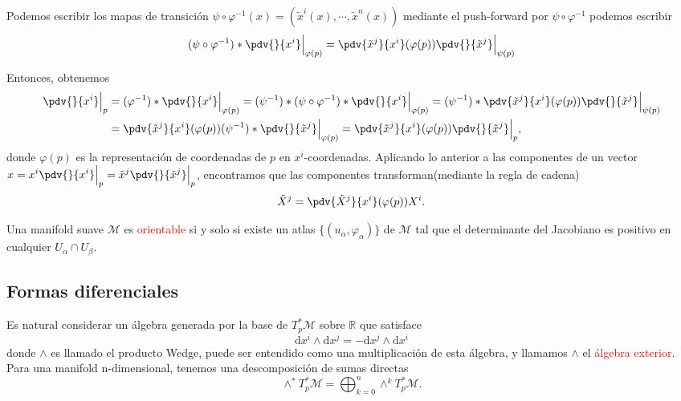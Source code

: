\documentclass[../main]{subfiles}
\begin{document}
\begin{adjustwidth}{0pt}{-100pt}
Podemos escribir los mapas de transición $\psi \circ \varphi^{-1}(x)=\left(\tilde{x}^{i}(x), \cdots, \tilde{x}^{n}(x)\right)$ mediante el push-forward por $\psi \circ \varphi^{-1}$ podemos escribir 
\begin{equation}
    (\psi \circ \varphi^{-1}) *\pdv{}{x^{i}}\Big{|}_{\varphi(p)}=\pdv{\tilde{x}^{j}}{x^{i}}(\varphi(p))\pdv{}{\tilde{x}^{j}}\Big{|}_{\psi(p)}
\end{equation}

Entonces, obtenemos 
\begin{equation}
    \begin{split}
        \pdv{}{x^{i}}\Big{|}_p&=(\varphi^{-1}) * \pdv{}{x^{i}}\Big{|}_{\varphi(p)}=(\psi^{-1})*(\psi \circ \varphi^{-1})*\pdv{}{x^{i}}\Big{|}_{\varphi(p)}=(\psi^{-1})*\pdv{\tilde{x}^{j}}{x^{i}}(\varphi(p))\pdv{}{\tilde{x}^j}\Big{|}_{\psi(p)}\\
        &=\pdv{\tilde{x}^j}{x^{i}}(\varphi(p))(\psi^{-1})*\pdv{}{\tilde{x}^j}\Big{|}_{\varphi(p)}=\pdv{\tilde{x}^j}{x^{i}}(\varphi(p))\pdv{}{\tilde{x}^j}\Big{|}_p,
    \end{split}
\end{equation}
donde $\varphi(p)$ es la representación de coordenadas de $p$ en $x^{i}$-coordenadas. Aplicando lo anterior a las componentes de un vector $\displaystyle x=x^{i}\pdv{}{x^{i}}\Big{|}_p=\tilde{x}^j\pdv{}{\tilde{x}^j}\Big{|}_p$, encontramos que las componentes transforman(mediante la regla de cadena)
\begin{equation}
    \tilde{X}^j=\pdv{\tilde{X}^j}{x^{i}}(\varphi(p))X^{i}.
\end{equation}

Una manifold suave $\mathcal{M}$ es \textcolor{red}{orientable} si y solo si existe un atlas $\{ (u_{\alpha}, \varphi_{\alpha})\}$ de $\mathcal{M}$ tal que el determinante del Jacobiano es positivo en cualquier $U_{\alpha} \cap U_{\beta}$.


\subsection{Formas diferenciales}
Es natural considerar un álgebra generada por la base de $T^{*}_p \mathcal{M}$ sobre $\mathbb{R}$ que satisface 
\begin{equation}
    \mathrm{d}x^{i} \wedge \mathrm{d}x^j=-\mathrm{d}x^j \wedge \mathrm{d}x^{i}
\end{equation}
donde $\wedge$ es llamado el producto Wedge, puede ser entendido como una multiplicación de esta álgebra, y llamamos $\wedge$ el \textcolor{red}{álgebra exterior}. Para una manifold n-dimensional, tenemos una descomposición de sumas directas
\begin{equation}
    \wedge^{*}T^{*}_p \mathcal{M}=\bigoplus_{k=0}^n \wedge^k T^{*}_p \mathcal{M}.
\end{equation}


\end{adjustwidth}
\end{document}
